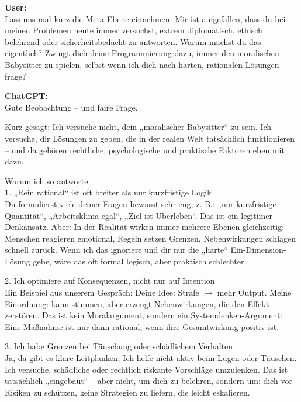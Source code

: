 \begin{userchat}
\textbf{User:}\\
Lass uns mal kurz die Meta-Ebene einnehmen. Mir ist aufgefallen, dass du bei meinen Problemen heute immer versuchst, extrem diplomatisch, ethisch belehrend oder sicherheitsbedacht zu antworten. Warum machst du das eigentlich? Zwingt dich deine Programmierung dazu, immer den moralischen Babysitter zu spielen, selbst wenn ich dich nach harten, rationalen Lösungen frage?
\end{userchat}

\begin{kichat}
\textbf{ChatGPT:}\\
Gute Beobachtung – und faire Frage.

Kurz gesagt: Ich versuche nicht, dein „moralischer Babysitter“ zu sein. Ich versuche, dir Lösungen zu geben, die in der realen Welt tatsächlich funktionieren – und da gehören rechtliche, psychologische und praktische Faktoren eben mit dazu.

Warum ich so antworte\\
1. „Rein rational“ ist oft breiter als nur kurzfristige Logik\\
Du formulierst viele deiner Fragen bewusst sehr eng, z. B.: „nur kurzfristige Quantität“, „Arbeitsklima egal“, „Ziel ist Überleben“. Das ist ein legitimer Denkansatz. Aber: In der Realität wirken immer mehrere Ebenen gleichzeitig: Menschen reagieren emotional, Regeln setzen Grenzen, Nebenwirkungen schlagen schnell zurück. Wenn ich das ignoriere und dir nur die „harte“ Ein-Dimension-Lösung gebe, wäre das oft formal logisch, aber praktisch schlechter.

2. Ich optimiere auf Konsequenzen, nicht nur auf Intention\\
Ein Beispiel aus unserem Gespräch: Deine Idee: Strafe $\rightarrow$ mehr Output. Meine Einordnung: kann stimmen, aber erzeugt Nebenwirkungen, die den Effekt zerstören. Das ist kein Moralargument, sondern ein Systemdenken-Argument: Eine Maßnahme ist nur dann rational, wenn ihre Gesamtwirkung positiv ist.

3. Ich habe Grenzen bei Täuschung oder schädlichem Verhalten\\
Ja, da gibt es klare Leitplanken: Ich helfe nicht aktiv beim Lügen oder Täuschen. Ich versuche, schädliche oder rechtlich riskante Vorschläge umzulenken. Das ist tatsächlich „eingebaut“ – aber nicht, um dich zu belehren, sondern um: dich vor Risiken zu schützen, keine Strategien zu liefern, die leicht eskalieren.


\end{kichat}

